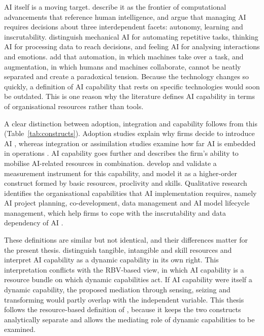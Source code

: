 AI itself is a moving target. \textcite{berente2021} describe it as the frontier of computational advancements that reference human intelligence, and argue that managing AI requires decisions about three interdependent facets: autonomy, learning and inscrutability. \textcite{huang2021} distinguish mechanical AI for automating repetitive tasks, thinking AI for processing data to reach decisions, and feeling AI for analysing interactions and emotions. \textcite{raisch2021} add that automation, in which machines take over a task, and augmentation, in which humans and machines collaborate, cannot be neatly separated and create a paradoxical tension. Because the technology changes so quickly, a definition of AI capability that rests on specific technologies would soon be outdated. This is one reason why the literature defines AI capability in terms of organisational resources rather than tools.

A clear distinction between adoption, integration and capability follows from this (Table~\ref{tab:constructs}). Adoption studies explain why firms decide to introduce AI \parencite{chatterjee2021}, whereas integration or assimilation studies examine how far AI is embedded in operations \parencite{fossowamba2022}. AI capability goes further and describes the firm's ability to mobilise AI-related resources in combination. \textcite{mikalef2021ai} develop and validate a measurement instrument for this capability, and \textcite{chen2022} model it as a higher-order construct formed by basic resources, proclivity and skills. Qualitative research identifies the organisational capabilities that AI implementation requires, namely AI project planning, co-development, data management and AI model lifecycle management, which help firms to cope with the inscrutability and data dependency of AI \parencite{weber2023}.

These definitions are similar but not identical, and their differences matter for the present thesis. \textcite{shao2026} distinguish tangible, intangible and skill resources and interpret AI capability as a dynamic capability in its own right. This interpretation conflicts with the RBV-based view, in which AI capability is a resource bundle on which dynamic capabilities act. If AI capability were itself a dynamic capability, the proposed mediation through sensing, seizing and transforming would partly overlap with the independent variable. This thesis follows the resource-based definition of \textcite{mikalef2021ai}, because it keeps the two constructs analytically separate and allows the mediating role of dynamic capabilities to be examined.

